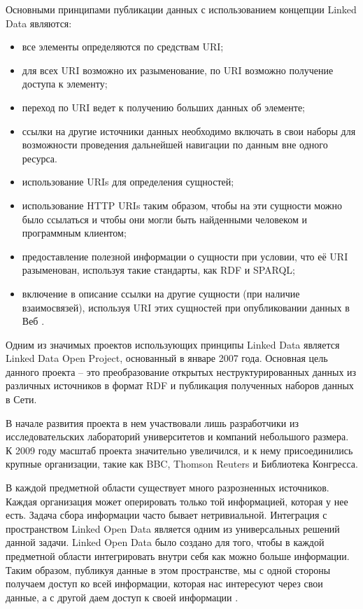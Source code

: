 Основными принципами публикации данных с использованием концепции Linked Data являются:

\begin{itemize}
\item все элементы определяются по средствам  URI;
\item для всех URI возможно их разыменование,  по URI возможно получение доступа к элементу;
\item переход по URI ведет к получению больших данных об элементе;
\item ссылки на другие источники данных необходимо включать в свои наборы для возможности проведения дальнейшей навигации по данным вне одного ресурса. 
\end{itemize}

\begin{itemize}
\item использование URIs для определения сущностей;
\item использование HTTP URIs таким образом, чтобы на эти сущности можно было ссылаться и чтобы они могли быть найденными человеком и программным клиентом;
\item предоставление полезной информации о сущности при условии, что её URI разыменован, используя такие стандарты, как RDF и SPARQL;
\item включение в описание ссылки на другие сущности (при наличие взаимосвязей), используя URI этих сущностей при опубликовании данных в Веб \cite{bizer2008linked}.
\end{itemize}

Одним из значимых проектов использующих принципы Linked Data является Linked Data Open Project, основанный в январе 2007 года. Основная цель данного проекта – это преобразование открытых неструктурированных данных из различных источников в формат RDF и публикация полученных наборов данных в Сети.

В начале развития проекта в нем участвовали лишь разработчики из исследовательских лабораторий университетов и компаний небольшого размера. К 2009 году масштаб проекта значительно увеличился, и к нему присоединились крупные организации, такие как BBC, Thomson Reuters и Библиотека Конгресса.

В каждой предметной области существует много разрозненных источников. Каждая организация может оперировать только той информацией, которая у нее есть. Задача сбора информации часто бывает нетривиальной. Интеграция с пространством Linked Open Data является одним из универсальных решений данной задачи. Linked Open Data было создано для того, чтобы в каждой предметной области интегрировать внутри себя как можно больше информации. Таким образом, публикуя данные в этом пространстве, мы с одной стороны получаем доступ ко всей информации, которая нас интересуют через свои данные, а с другой даем доступ к своей информации \cite{malakhov2014integration}.

